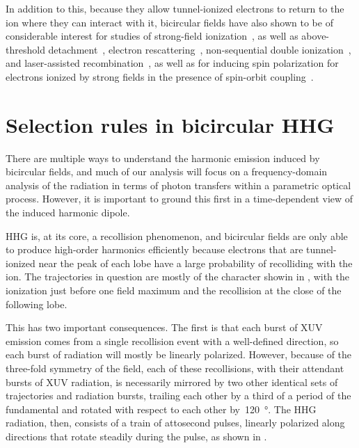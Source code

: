 In addition to this, because they allow tunnel-ionized electrons to return to the ion where they can interact with it, bicircular fields have also shown to be of considerable interest for studies of strong-field ionization~\cite{ mancuso_bicircular-ionization_2015,mancuso_bicircular-rescattering_2016,ngoko-starace_multistart-spiral-ionization_2016, milosevic_bicircular-ionization-sfa_2016, chaloupka_bicircular-double-ionization_2016}, as well as above-threshold detachment~\cite{kramo_bicircular-atd_2007}, electron rescattering~\cite{hasovic_rescattering-bicircular_2016}, non-sequential double ionization~\cite{eckart_bicircular-nsdi_2016},  and laser-assisted recombination~\cite{odzak_bicircular-laser-assisted-recombination_2015}, as well as for inducing spin polarization for electrons ionized by strong fields in the presence of spin-orbit coupling~\cite{ milosevic_bicircular-spin-polarization_2016, hartung_spin-polarization-ionization_2016}.











\section{Selection rules in bicircular HHG}
\label{sec:hhg-selection-rules}
There are multiple ways to understand the harmonic emission induced by bicircular fields, and much of our analysis will focus on a frequency-domain analysis of the radiation in terms of photon transfers within a parametric optical process. However, it is important to ground this first in a time-dependent view of the induced harmonic dipole.


HHG is, at its core, a recollision phenomenon, and bicircular fields are only able to produce high-order harmonics efficiently because electrons that are tunnel-ionized near the peak of each lobe have a large probability of recolliding with the ion. The trajectories in question are mostly of the  character showin in , with the ionization just before one field maximum and the recollision at the close of the following lobe. 

This has two important consequences. The first is that each burst of XUV emission comes from a single recollision event with a well-defined direction, so each burst of radiation will mostly be linearly polarized. However, because of the three-fold symmetry of the field, each of these recollisions, with their attendant bursts of XUV radiation, is necessarily mirrored by two other identical sets of trajectories and radiation bursts, trailing each other by a third of a period of the fundamental and rotated with respect to each other by~\SI{120}{\degree}. The HHG radiation, then, consists of a train of attosecond pulses, linearly polarized along directions that rotate steadily during the pulse, as shown in .




